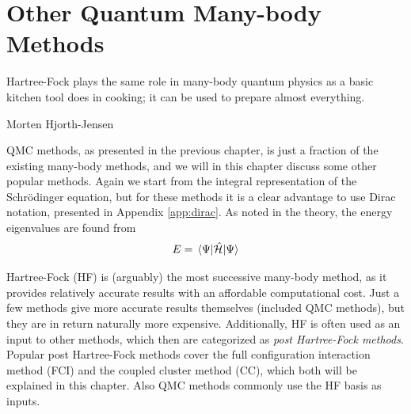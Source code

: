 \chapter{Other Quantum Many-body Methods} \label{chp:othermethods}
\epigraph{Hartree-Fock plays the same role in many-body quantum physics as a basic kitchen tool does in cooking; it can be used to prepare almost everything.}{Morten Hjorth-Jensen}

QMC methods, as presented in the previous chapter, is just a fraction of the existing many-body methods, and we will in this chapter discuss some other popular methods. Again we start from the integral representation of the Schrödinger equation, but for these methods it is a clear advantage to use Dirac notation, presented in Appendix \ref{app:dirac}. As noted in the theory, the energy eigenvalues are found from
\begin{equation}
E=\mel{\Psi}{\hat{\mathcal{H}}}{\Psi}
\end{equation}

Hartree-Fock (HF) is (arguably) the most successive many-body method, as it provides relatively accurate results with an affordable computational cost. Just a few methods give more accurate results themselves (included QMC methods), but they are in return naturally more expensive. Additionally, HF is often used as an input to other methods, which then are categorized as \textit{post Hartree-Fock methods}. Popular post Hartree-Fock methods cover the full configuration interaction method (FCI) and the coupled cluster method (CC), which both will be explained in this chapter. Also QMC methods commonly use the HF basis as inputs.

